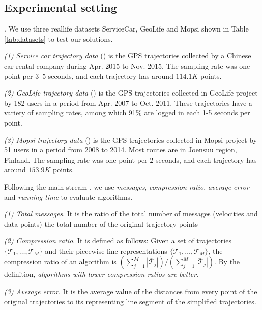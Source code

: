 \subsection{Experimental setting}

. We use three reallife datasets ServiceCar, GeoLife and Mopsi shown in Table \ref{tab:datasets} to test our solutions.

\vspace{0.5ex}
\ni \emph{(1) Service car trajectory data} (\sercar) is the GPS trajectories collected by a Chinese car rental company during Apr. 2015 to Nov. 2015. The sampling rate was one point per $3$--$5$ seconds, and
each trajectory has around $114.1K$ points.

\vspace{0.5ex}
\ni \emph{(2) GeoLife trajectory data} (\geolife) is the GPS trajectories collected in GeoLife project by 182 users in a period from Apr. 2007 to Oct. 2011. These trajectories have a variety of sampling rates, among which 91\% are logged in each 1-5 seconds per point. %

\vspace{0.5ex}
\ni \emph{(3) Mopsi trajectory data} (\mopsi) is the GPS trajectories collected in Mopsi project by 51 users in a period from 2008 to 2014. Most routes are in Joensuu region, Finland.
The sampling rate was one point per $2$ seconds, and each trajectory has around $153.9K$ points.

Following the main stream \cite{Trajcevski:LDRH, Lange:GRTS, Lange:Tracking, Lin:Cised, Zhang:Evaluation}, we use \emph{messages}, \emph{compression ratio}, \emph{average error} and \emph{running time} to evaluate algorithms.

 \ni \emph{(1) Total messages}. It is the ratio of the total number of messages (velocities and data points) \wrt the total number of the original trajectory points
 
 \ni \emph{(2) Compression ratio}. It is defined as follows: Given a set of trajectories $\{\dddot{\mathcal{T}_1}, \ldots, \dddot{\mathcal{T}_M}\}$ and their piecewise line representations $\{\overline{\mathcal{T}_1}, \ldots, \overline{\mathcal{T}_M}\}$, the compression ratio of an algorithm is $(\sum_{j=1}^{M} |\overline{\mathcal{T}}_j |)/(\sum_{j=1}^{M} |\dddot{\mathcal{T}}_j |)$.
 By the definition, \emph{algorithms with lower compression ratios are better}.
 
 \ni \emph{(3) Average error}. It is the average value of the distances from every point of the original trajectories to its representing line segment of the simplified trajectories.
 
